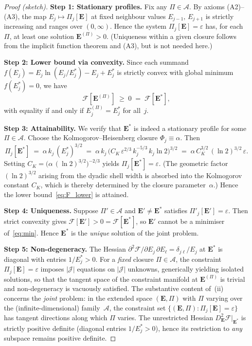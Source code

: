 \documentclass[12pt,a4paper]{article}
\theoremstyle{definition}
\theoremstyle{plain}
\theoremstyle{remark}
\begin{document}
\begin{proof}[Proof (sketch)]
\textbf{Step 1: Stationary profiles.}\;
Fix any $\Pi \in \mathscr{A}$.  By axioms (A2)--(A3), the map
$E_j \mapsto \Pi_j[\mathbf{E}]$ at fixed neighbour values
$E_{j-1},\,E_{j+1}$ is strictly increasing and ranges over
$(0,\infty)$.  Hence the system
$\Pi_j[\mathbf{E}] = \varepsilon$ has, for each $\Pi$, at least one
solution $\mathbf{E}^{(\Pi)} > 0$.  (Uniqueness within a given closure
follows from the implicit function theorem and (A3), but is not needed here.)

\textbf{Step 2: Lower bound via convexity.}\;
Since each summand $f(E_j) = E_j\ln(E_j/E_j^*) - E_j + E_j^*$ is
strictly convex with global minimum $f(E_j^*) = 0$, we have
\begin{equation}\label{eq:F_lower}
  \mathcal{F}[\mathbf{E}^{(\Pi)}]
  \;\ge\; 0
  \;=\; \mathcal{F}[\mathbf{E}^*],
\end{equation}
with equality if and only if $E_j^{(\Pi)} = E_j^*$ for all~$j$.

\textbf{Step 3: Attainability.}\;
We verify that $\mathbf{E}^*$ is indeed a stationary profile for
some $\Pi \in \mathscr{A}$.  Choose the Kolmogorov--Heisenberg closure
$\Phi_j \equiv \alpha$.  Then
\[
  \Pi_j[\mathbf{E}^*]
  \;=\; \alpha\,k_j\,(E_j^*)^{3/2}
  \;=\; \alpha\,k_j\,
    \bigl(C_K\,\varepsilon^{2/3}\,k_j^{-5/3}\,k_j\ln 2\bigr)^{3/2}
  \;=\; \alpha\,C_K^{3/2}\,(\ln 2)^{3/2}\,\varepsilon.
\]
Setting $C_K = \bigl(\alpha\,(\ln 2)^{3/2}\bigr)^{-2/3}$ yields
$\Pi_j[\mathbf{E}^*] = \varepsilon$.  (The geometric factor $(\ln 2)^{3/2}$
arising from the dyadic shell width is absorbed into the Kolmogorov
constant $C_K$, which is thereby determined by the closure
parameter~$\alpha$.)  Hence the lower bound~\eqref{eq:F_lower} is
attained.

\textbf{Step 4: Uniqueness.}\;
Suppose $\Pi' \in \mathscr{A}$ and $\mathbf{E}' \ne \mathbf{E}^*$ satisfies
$\Pi'_j[\mathbf{E}'] = \varepsilon$.  Then strict convexity gives
$\mathcal{F}[\mathbf{E}'] > 0 = \mathcal{F}[\mathbf{E}^*]$, so $\mathbf{E}'$
cannot be a minimiser of~\eqref{eq:min}.  Hence $\mathbf{E}^*$ is the
\emph{unique} solution of the joint problem.

\textbf{Step 5: Non-degeneracy.}\;
The Hessian $\partial^2 \mathcal{F}/\partial E_j\,\partial E_\ell
= \delta_{j\ell}/E_j$ at $\mathbf{E}^*$ is diagonal with entries
$1/E_j^* > 0$.  For a \emph{fixed} closure $\Pi \in \mathscr{A}$, the
constraint $\Pi_j[\mathbf{E}] = \varepsilon$ imposes $|\mathcal{J}|$
equations on $|\mathcal{J}|$ unknowns, generically yielding isolated
solutions, so that the tangent space of the constraint manifold at
$\mathbf{E}^{(\Pi)}$ is trivial and non-degeneracy is vacuously satisfied.
The substantive content of~(ii) concerns the \emph{joint} problem: in the
extended space $(\mathbf{E}, \Pi)$ with $\Pi$ varying over the
(infinite-dimensional) family~$\mathscr{A}$, the constraint set
$\{(\mathbf{E}, \Pi) : \Pi_j[\mathbf{E}] = \varepsilon\}$ has tangent
directions along which $\Pi$ varies.  The unrestricted Hessian
$D^2_{\mathbf{E}}\mathcal{F}|_{\mathbf{E}^*}$ is strictly positive
definite (diagonal entries $1/E_j^* > 0$), hence its restriction to
\emph{any} subspace remains positive definite.


\end{proof}
\end{document}
